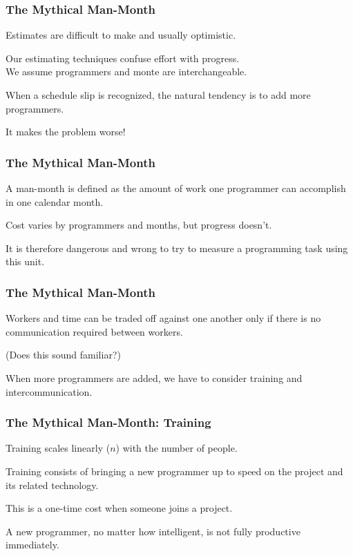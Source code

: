 \begin{frame}
\frametitle{The Mythical Man-Month}
\begin{changemargin}{1cm}
Estimates are difficult to make and usually optimistic.

Our estimating techniques confuse effort with progress.\\
We assume programmers and monte are interchangeable. 

When a schedule slip is recognized, the natural tendency is to add more programmers. 

It makes the problem worse! 
\end{changemargin}
\end{frame}

\begin{frame}
\frametitle{The Mythical Man-Month}
\begin{changemargin}{1cm}
A \alert{man-month} is defined as the amount of work one programmer can accomplish in one calendar month. 

Cost varies by programmers and months, but progress doesn't. 

It is therefore dangerous and wrong to try to measure a programming task using this unit.
\end{changemargin}
\end{frame}

\begin{frame}
\frametitle{The Mythical Man-Month}
\begin{changemargin}{1cm}
Workers and time can be traded off against one another only if there is no communication required between workers. 

(Does this sound familiar?) 

When more programmers are added, we have to consider training and intercommunication.
\end{changemargin}
\end{frame}

\begin{frame}
\frametitle{The Mythical Man-Month: Training}
\begin{changemargin}{1cm}
Training scales linearly ($n$) with the number of people. 

Training consists of bringing a new programmer up to speed on the project and its related technology. 

This is a one-time cost when someone joins a project. 

A new programmer, no matter how intelligent, is not fully productive immediately.
\end{changemargin}
\end{frame}

